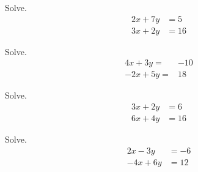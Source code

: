 \vfill
\begin{center}
	\hfill
\end{center}

\newpage

\begin{multicols}{2}
	\begin{exercise}Solve.
		\begin{align*}
			2x+7y & =5  \\
			3x+2y & =16
		\end{align*}
	\end{exercise}


	\begin{exercise}
		Solve.
		\begin{align*}
			4x+3y=  & -10 \\
			-2x+5y= & 18
		\end{align*}
	\end{exercise}
\end{multicols}

\vfill
\begin{center}
	\hfill
\end{center}

\begin{multicols}{2}
	\begin{exercise}Solve.
		\begin{align*}
			3x+2y & =6  \\
			6x+4y & =16
		\end{align*}
	\end{exercise}


	\begin{exercise}
		Solve.
		\begin{align*}
			2x-3y  & =-6 \\
			-4x+6y & =12
		\end{align*}
	\end{exercise}

\end{multicols}


